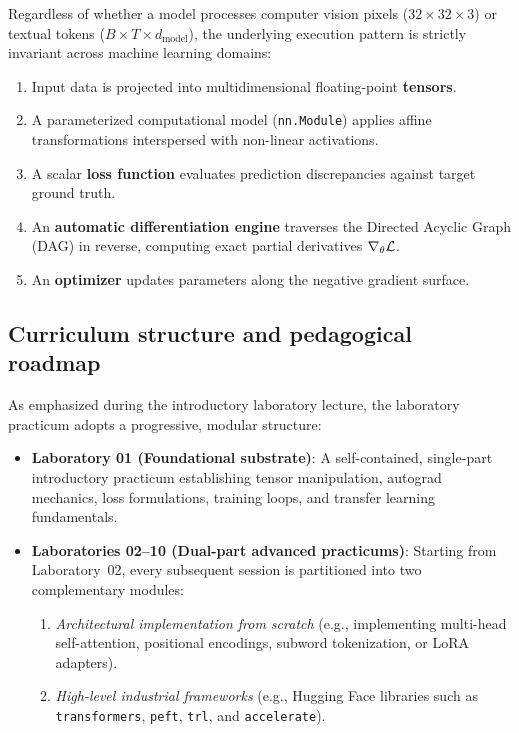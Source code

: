 \documentclass[../labs.tex]{subfiles}
\begin{document}
Regardless of whether a model processes computer vision pixels ($32 \times 32 \times 3$) or textual tokens ($B \times T \times d_{\text{model}}$), the underlying execution pattern is strictly invariant across machine learning domains:
\begin{enumerate}
    \item Input data is projected into multidimensional floating-point \textbf{tensors}.
    \item A parameterized computational model (\texttt{nn.Module}) applies affine transformations interspersed with non-linear activations.
    \item A scalar \textbf{loss function} evaluates prediction discrepancies against target ground truth.
    \item An \textbf{automatic differentiation engine} traverses the Directed Acyclic Graph (DAG) in reverse, computing exact partial derivatives $\nabla_\theta \mathcal{L}$.
    \item An \textbf{optimizer} updates parameters along the negative gradient surface.
\end{enumerate}

\subsection{Curriculum structure and pedagogical roadmap}
As emphasized during the introductory laboratory lecture, the laboratory practicum adopts a progressive, modular structure:
\begin{itemize}
    \item \textbf{Laboratory 01 (Foundational substrate)}: A self-contained, single-part introductory practicum establishing tensor manipulation, autograd mechanics, loss formulations, training loops, and transfer learning fundamentals.
    \item \textbf{Laboratories 02--10 (Dual-part advanced practicums)}: Starting from Laboratory~02, every subsequent session is partitioned into two complementary modules:
    \begin{enumerate}
        \item \emph{Architectural implementation from scratch} (e.g., implementing multi-head self-attention, positional encodings, subword tokenization, or LoRA adapters).
        \item \emph{High-level industrial frameworks} (e.g., Hugging Face libraries such as \texttt{transformers}, \texttt{peft}, \texttt{trl}, and \texttt{accelerate}).
    \end{enumerate}
\end{itemize}
\end{document}
